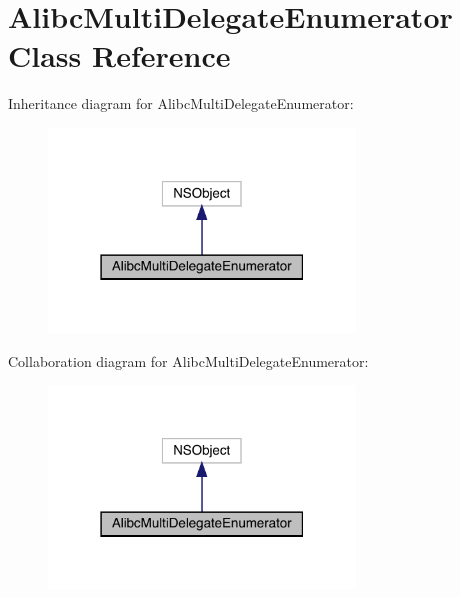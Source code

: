\hypertarget{interface_alibc_multi_delegate_enumerator}{}\section{Alibc\+Multi\+Delegate\+Enumerator Class Reference}
\label{interface_alibc_multi_delegate_enumerator}


Inheritance diagram for Alibc\+Multi\+Delegate\+Enumerator\+:\nopagebreak
\begin{figure}[H]
\begin{center}
\leavevmode
\includegraphics[width=231pt]{interface_alibc_multi_delegate_enumerator__inherit__graph}
\end{center}
\end{figure}


Collaboration diagram for Alibc\+Multi\+Delegate\+Enumerator\+:\nopagebreak
\begin{figure}[H]
\begin{center}
\leavevmode
\includegraphics[width=231pt]{interface_alibc_multi_delegate_enumerator__coll__graph}
\end{center}
\end{figure}
